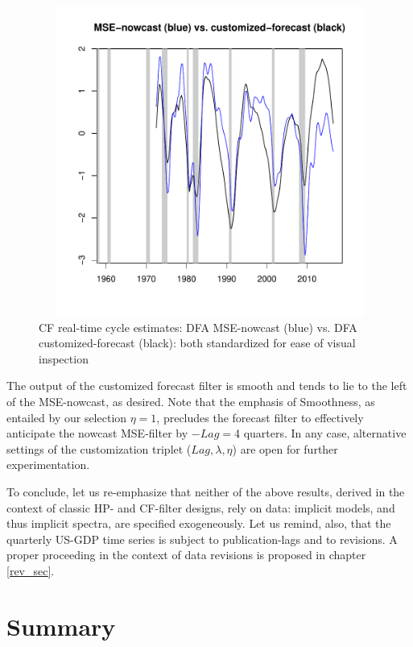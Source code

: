 \documentclass[a4paper]{book}
\begin{document}
\begin{enumerate}
\begin{figure}[H]\begin{center}\includegraphics[height=4in, width=6in]{z_HP_us_real_log_gdp_cf_out_cust}\caption{CF real-time cycle estimates: DFA MSE-nowcast (blue) vs. DFA customized-forecast (black): both standardized for ease of visual inspection\label{z_HP_us_real_log_gdp_cf_out_cust}}\end{center}\end{figure}The output of the customized forecast filter is smooth and tends to lie to the left of the MSE-nowcast, as desired. Note that the emphasis of Smoothness, as entailed by our selection $\eta=1$, precludes the forecast filter to effectively anticipate the nowcast MSE-filter by $-Lag=$4 quarters. In any case, alternative settings of the customization triplet ($Lag,\lambda,\eta$) are open for further experimentation. 
\end{enumerate}
To conclude, let us re-emphasize that neither of the above results, derived in the context of classic HP- and CF-filter designs, rely on data: implicit models, and thus implicit spectra, are specified exogeneously. Let us remind, also, that the quarterly US-GDP time series is subject to publication-lags and to revisions. A proper proceeding in the context of data revisions is proposed in chapter \ref{rev_sec}.




\section{Summary}
\end{document}
